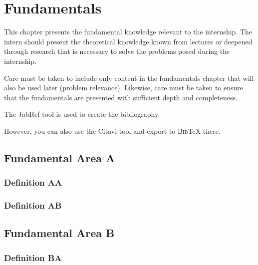 \documentclass[oneside]{ausarbeitung}
\begin{document}
\chapter{Fundamentals}
\label{cha:grundlagen}

This chapter presents the fundamental knowledge relevant to the internship.
The intern should present the theoretical knowledge known from lectures
or deepened through research that is necessary to solve the problems posed during the internship.

Care must be taken to include only content in the fundamentals chapter
that will also be used later (problem relevance).
Likewise, care must be taken to ensure that the fundamentals are presented
with sufficient depth and completeness.

The JabRef tool\autocite{JabRef:JabRef} is used to create the bibliography.

However, you can also use the Citavi tool\autocite{SAS:Citavi}
and export to \textsc{Bib}\TeX{} there.

\section{Fundamental Area A}
\label{sec:grundlagengebieta}

\blindtext

\subsection{Definition AA}
\label{sub:definitionaa}

\blindtext

\subsection{Definition AB}
\label{sub:definitionab}

\blindtext

\section{Fundamental Area B}
\label{sec:grundlagengebietb}

\blindtext

\subsection{Definition BA}
\label{sub:definitionBa}

\blindtext
\end{document}
